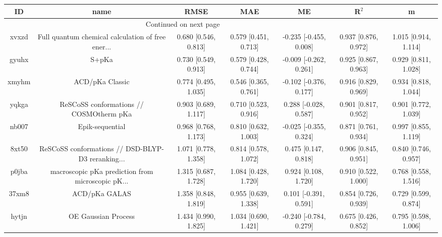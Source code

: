 \documentclass{article}
\begin{document}
\begin{center}
\begin{longtable}{|ccccccc|}
\toprule
    ID &                                               name &                  RMSE &                   MAE &                       ME &                 R$^2$ &                      m \\
\midrule
\endhead
\midrule
\multicolumn{3}{r}{{Continued on next page}} \\
\midrule
\endfoot

\bottomrule
\endlastfoot
 xvxzd &  Full quantum chemical calculation of free ener... &  0.680 [0.546, 0.813] &  0.579 [0.451, 0.713] &   -0.235 [-0.455, 0.008] &  0.937 [0.876, 0.972] &   1.015 [0.914, 1.114] \\
 gyuhx &                                              S+pKa &  0.730 [0.549, 0.913] &  0.579 [0.428, 0.744] &   -0.009 [-0.262, 0.261] &  0.925 [0.867, 0.963] &   0.929 [0.811, 1.028] \\
 xmyhm &                                    ACD/pKa Classic &  0.774 [0.495, 1.035] &  0.546 [0.365, 0.761] &   -0.102 [-0.376, 0.177] &  0.916 [0.829, 0.969] &   0.934 [0.818, 1.044] \\
 yqkga &            ReSCoSS conformations // COSMOtherm pKa &  0.903 [0.689, 1.117] &  0.710 [0.523, 0.916] &    0.288 [-0.028, 0.587] &  0.901 [0.817, 0.952] &   0.901 [0.772, 1.039] \\
 nb007 &                                    Epik-sequential &  0.968 [0.768, 1.173] &  0.810 [0.632, 1.003] &   -0.025 [-0.355, 0.324] &  0.871 [0.761, 0.934] &   0.997 [0.855, 1.119] \\
 8xt50 &  ReSCoSS conformations // DSD-BLYP-D3 reranking... &  1.071 [0.778, 1.358] &  0.814 [0.578, 1.072] &     0.475 [0.147, 0.818] &  0.906 [0.845, 0.951] &   0.840 [0.746, 0.957] \\
 p0jba &  macroscopic pKa prediction from microscopic pK... &  1.315 [0.687, 1.728] &  1.084 [0.428, 1.720] &     0.924 [0.108, 1.720] &  0.910 [0.522, 1.000] &   0.768 [0.558, 1.516] \\
 37xm8 &                                      ACD/pKa GALAS &  1.358 [0.848, 1.819] &  0.955 [0.639, 1.338] &    0.101 [-0.391, 0.591] &  0.854 [0.726, 0.939] &   0.729 [0.599, 0.874] \\
 hytjn &                                OE Gaussian Process &  1.434 [0.990, 1.825] &  1.034 [0.690, 1.421] &   -0.240 [-0.784, 0.279] &  0.675 [0.426, 0.852] &   0.795 [0.598, 1.006] \\

\end{longtable}
\end{center}
\end{document}
